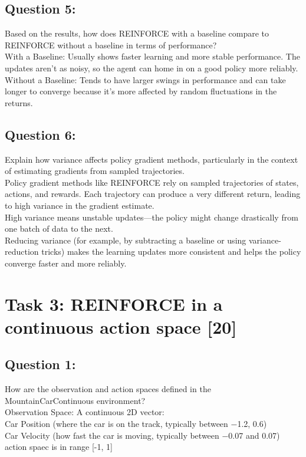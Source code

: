 \documentclass[12pt]{article}
\begin{document}
{{{				\subsection{Question 5:}
				
				Based on the results, how does REINFORCE with a baseline compare to REINFORCE without a baseline in terms of performance?\\
				With a Baseline: Usually shows faster learning and more stable performance. The updates aren’t as noisy, so the agent can home in on a good policy more reliably.\\
				Without a Baseline: Tends to have larger swings in performance and can take longer to converge because it’s more affected by random fluctuations in the returns.
				\vspace*{0.3cm}
				
				\subsection{Question 6:}
				
				Explain how variance affects policy gradient methods, particularly in the context of estimating gradients from sampled trajectories.\\
				Policy gradient methods like REINFORCE rely on sampled trajectories of states, actions, and rewards. Each trajectory can produce a very different return, leading to high variance in the gradient estimate.\\
				High variance means unstable updates—the policy might change drastically from one batch of data to the next.\\
				Reducing variance (for example, by subtracting a baseline or using variance-reduction tricks) makes the learning updates more consistent and helps the policy converge faster and more reliably.
				
				\newpage
				
				\section{Task 3: REINFORCE in a continuous action space [20]}
				
				\subsection{Question 1:}
				
				How are the observation and action spaces defined in the MountainCarContinuous environment?\\
				Observation Space: A continuous 2D vector:\\
				Car Position (where the car is on the track, typically between −1.2, 0.6)\\
				Car Velocity (how fast the car is moving, typically between −0.07 and 0.07) \\
				action spaec is in range [-1, 1]
				\vspace*{0.3cm}
				
}}}
\end{document}
